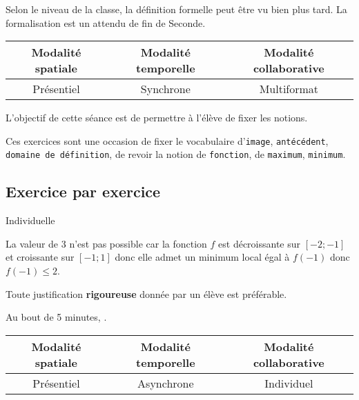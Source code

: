 \begin{Att}
Selon le niveau de la classe, la définition formelle peut être vu bien plus tard. La formalisation est un attendu de fin de Seconde.
\end{Att}


\begin{seanceprof}

\end{seanceprof}

\begin{tabular}{|c|c|c|}
\hline 
Modalité spatiale & Modalité temporelle & Modalité collaborative \\ 
\hline 
Présentiel & Synchrone & Multiformat \\ 
\hline 
\end{tabular} 


L'objectif de cette séance est de permettre à l'élève de fixer les notions. 

Ces exercices sont une occasion de fixer le vocabulaire d'\texttt{image}, \texttt{antécédent}, \texttt{domaine de définition}, de revoir la notion de \texttt{fonction}, de \texttt{maximum}, \texttt{minimum}.



\subsection{Exercice par exercice}


Individuelle

La valeur de 3 n'est pas possible car la fonction $f$ est décroissante sur $[-2;-1]$ et croissante sur $[-1;1]$ donc elle admet un minimum local égal à $f(-1)$ donc $f(-1) \leq 2$.

Toute justification  \textbf{rigoureuse} donnée par un élève est préférable.

Au bout de 5 minutes, .



\begin{seanceprof}

\end{seanceprof}

\begin{tabular}{|c|c|c|}
\hline 
Modalité spatiale & Modalité temporelle & Modalité collaborative \\ 
\hline 
Présentiel & Asynchrone & Individuel \\ 
\hline 
\end{tabular} 



